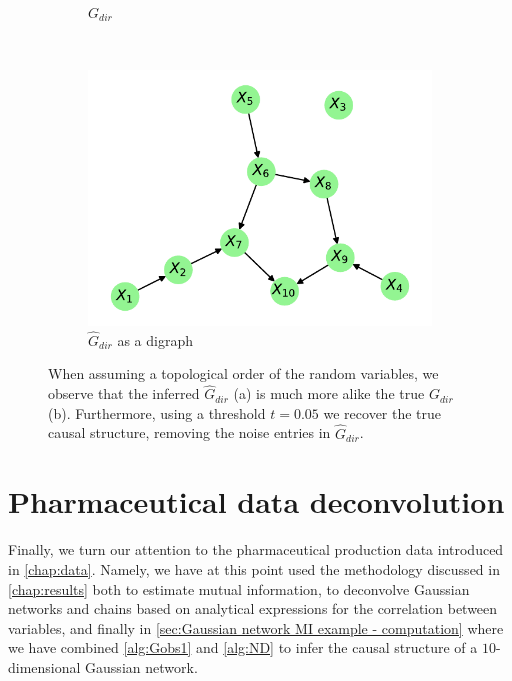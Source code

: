 \documentclass[../Thesis.tex]{subfiles}
\begin{document}
\begin{figure}[H]
\begin{subfigure}[t]{0.49\linewidth}
        \caption{$G_{dir}$}
    \end{subfigure}
    \\[\baselineskip]
    \begin{subfigure}[t]{0.49\linewidth}
        \includegraphics[width = \linewidth]{figures/ND examples/Gaussian network 10 - G_dir as graph - triangular.pdf}
        \caption{$\hat{G}_{dir}$ as a digraph}
    \end{subfigure}
    \caption{When assuming a topological order of the random variables, we observe that the inferred $\hat{G}_{dir}$ (a) is much more alike the true $G_{dir}$ (b). Furthermore, using a threshold $t = 0.05$ we recover the true causal structure, removing the noise entries in $\hat{G}_{dir}$.}
    \label{fig:estimated MI 10 Gaussian results - triangular}
\end{figure}




\newpage
\section{Pharmaceutical data deconvolution}\label{sec:Results - pharmaceutical data}
Finally, we turn our attention to the pharmaceutical production data introduced in \autoref{chap:data}. Namely, we have at this point used the methodology discussed in \autoref{chap:results} both to estimate mutual information, to deconvolve Gaussian networks and chains based on analytical expressions for the correlation between variables, and finally in \autoref{sec:Gaussian network MI example - computation} where we have combined \autoref{alg:Gobs1} and \autoref{alg:ND} to infer the causal structure of a $10$-dimensional Gaussian network.
\end{document}
